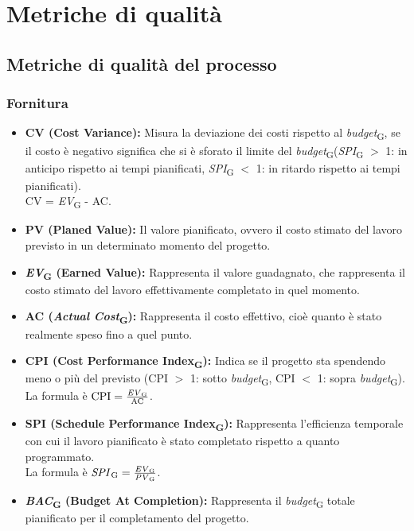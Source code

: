 \section{Metriche di qualità}
\subsection{Metriche di qualità del processo}
\subsubsection{Fornitura}
\begin{itemize}
    \item \textbf{CV (Cost Variance):} Misura la deviazione dei costi rispetto al \textit{budget}\textsubscript{G}, se il costo è negativo significa che si è sforato il limite del \textit{budget}\textsubscript{G}(\textit{SPI}\textsubscript{G} \( > \) 1: in anticipo rispetto ai tempi pianificati, \textit{SPI}\textsubscript{G} \( < \) 1: in ritardo rispetto ai tempi pianificati).
    \\CV = \textit{EV}\textsubscript{G} - AC.
    \item \textbf{PV (Planed Value):} Il valore pianificato, ovvero il costo stimato del lavoro previsto in un determinato momento del progetto.
    \item \textbf{\textit{EV}\textsubscript{G} (Earned Value):} Rappresenta il valore guadagnato, che rappresenta il costo stimato del lavoro effettivamente completato in quel momento.
    \item \textbf{AC (\textit{Actual Cost}\textsubscript{G}):} Rappresenta il costo effettivo, cioè quanto è stato realmente speso fino a quel punto.
    \item \textbf{CPI (Cost Performance Index\textsubscript{G}):} Indica se il progetto sta spendendo meno o più del previsto (CPI \( > \) 1: sotto \textit{budget}\textsubscript{G}, CPI \( < \) 1: sopra \textit{budget}\textsubscript{G}). \\ La formula è \( \text{CPI} = \frac{\text{\textit{EV}\textsubscript{G}}}{\text{AC}} \).
    \item \textbf{SPI (Schedule Performance Index\textsubscript{G}):} Rappresenta l'efficienza temporale con cui il lavoro pianificato è stato completato rispetto a quanto programmato.
    \\ La formula è \( \text{\textit{SPI}\textsubscript{G}} = \frac{\text{\textit{EV}\textsubscript{G}}}{\text{\textit{PV}\textsubscript{G}}} \).
    \item \textbf{\textit{BAC}\textsubscript{G} (Budget At Completion):} Rappresenta il \textit{budget}\textsubscript{G} totale pianificato per il completamento del progetto.

\end{itemize}
